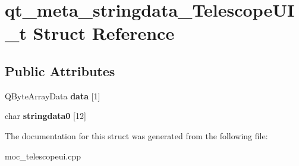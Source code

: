 \hypertarget{structqt__meta__stringdata__TelescopeUI__t}{}\section{qt\+\_\+meta\+\_\+stringdata\+\_\+\+Telescope\+U\+I\+\_\+t Struct Reference}
\label{structqt__meta__stringdata__TelescopeUI__t}
\subsection*{Public Attributes}
\begin{DoxyCompactItemize}
\item 
\mbox{\label{structqt__meta__stringdata__TelescopeUI__t_abe1ce71d11103a6a070a279e73bd8100}} 
Q\+Byte\+Array\+Data {\bfseries data} \mbox{[}1\mbox{]}
\item 
\mbox{\label{structqt__meta__stringdata__TelescopeUI__t_a7a0b1f46eb70de55102e74e6cbaeee51}} 
char {\bfseries stringdata0} \mbox{[}12\mbox{]}
\end{DoxyCompactItemize}


The documentation for this struct was generated from the following file\+:\begin{DoxyCompactItemize}
\item 
moc\+\_\+telescopeui.\+cpp\end{DoxyCompactItemize}
